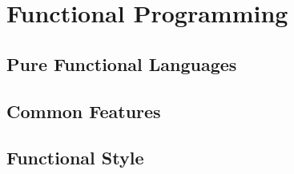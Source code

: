 \section{Functional Programming}

\subsection{Pure Functional Languages}

\subsection{Common Features}

\subsection{Functional Style}

